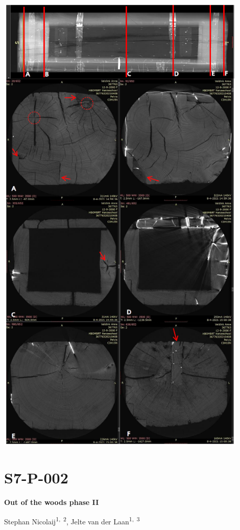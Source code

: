 \documentclass[
]{book}
\begin{document}
\includegraphics[width=0.9\textwidth,height=\textheight]{./figures/Doeve.png}

\hypertarget{s7-p-002}{%
\section*{S7-P-002}\label{s7-p-002}}

\textbf{Out of the woods phase II}

Stephan Nicolaij\textsuperscript{1,~2}, Jelte van der Laan\textsuperscript{1,~3}
\end{document}
